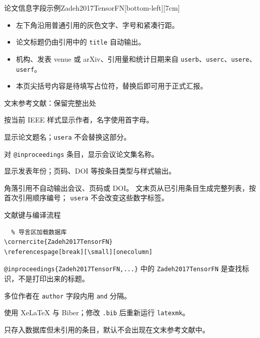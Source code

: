 \begin{paperframe}[字段实际呈现]{论文信息字段示例}{Zadeh2017TensorFN}[bottom-left][7cm]
  \begin{itemize}
    \item 左下角沿用普通引用的灰色文字、字号和紧凑行距。
    \item 论文标题仍由引用中的 \texttt{title} 自动输出。
    \item 机构、发表 venue 或 arXiv、引用量和统计日期来自 \texttt{userb}、\texttt{userc}、\texttt{usere}、\texttt{userf}。
    \item 本页尖括号内容是待填写占位符，替换后即可用于正式汇报。
  \end{itemize}
\end{paperframe}

\begin{frame}{文末参考文献：保留完整出处}
  \begin{description}
    \item[\texttt{author}] 按当前 IEEE 样式显示作者，名字使用首字母。
    \item[\texttt{title}] 显示论文题名；\texttt{usera} 不会替换这部分。
    \item[\texttt{booktitle}] 对 \texttt{@inproceedings} 条目，显示会议论文集名称。
    \item[\texttt{year}] 显示发表年份；页码、DOI 等按条目类型与样式输出。
  \end{description}
  \begin{notebox}[角落与文末的区别]
    角落引用不自动输出会议、页码或 DOI。
    文末页从已引用条目生成完整列表，按首次引用顺序编号；
    \texttt{usera} 不会改变这些数字标签。
  \end{notebox}
\end{frame}

\begin{frame}[fragile]{文献键与编译流程}
  \begin{verbatim}
  % 导言区加载数据库
\cornercite{Zadeh2017TensorFN}
\referencespage[break][\small][onecolumn]
  \end{verbatim}
  \begin{description}[文献键]
    \item[文献键] \texttt{@inproceedings\{Zadeh2017TensorFN,...\}} 中的
      \texttt{Zadeh2017TensorFN} 是查找标识，不是打印出来的标题。
    \item[作者名] 多位作者在 \texttt{author} 字段内用 \texttt{and} 分隔。
    \item[编译] 使用 XeLaTeX 与 Biber；修改 \texttt{.bib} 后重新运行 \texttt{latexmk}。
  \end{description}
  \medskip
  只存入数据库但未引用的条目，默认不会出现在文末参考文献中。
\end{frame}

